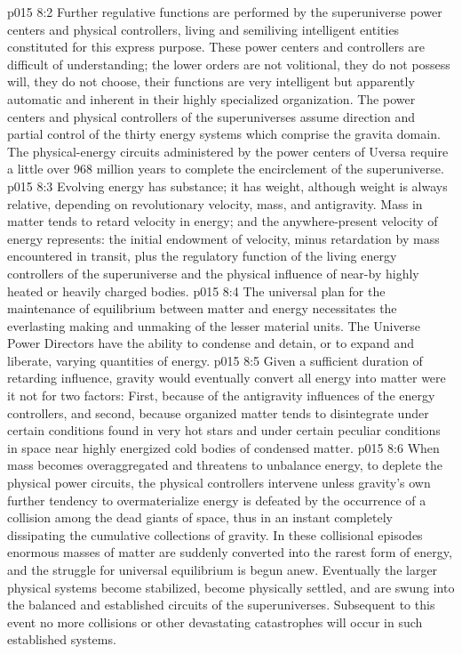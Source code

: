 \vs p015 8:2 Further regulative functions are performed by the superuniverse power centers and physical controllers, living and semiliving intelligent entities constituted for this express purpose. These power centers and controllers are difficult of understanding; the lower orders are not volitional, they do not possess will, they do not choose, their functions are very intelligent but apparently automatic and inherent in their highly specialized organization. The power centers and physical controllers of the superuniverses assume direction and partial control of the thirty energy systems which comprise the gravita domain. The physical\hyp{}energy circuits administered by the power centers of Uversa require a little over 968 million years to complete the encirclement of the superuniverse.
\vs p015 8:3 \pc Evolving energy has substance; it has weight, although weight is always relative, depending on revolutionary velocity, mass, and antigravity. Mass in matter tends to retard velocity in energy; and the anywhere\hyp{}present velocity of energy represents: the initial endowment of velocity, minus retardation by mass encountered in transit, plus the regulatory function of the living energy controllers of the superuniverse and the physical influence of near\hyp{}by highly heated or heavily charged bodies.
\vs p015 8:4 The universal plan for the maintenance of equilibrium between matter and energy necessitates the everlasting making and unmaking of the lesser material units. The Universe Power Directors have the ability to condense and detain, or to expand and liberate, varying quantities of energy.
\vs p015 8:5 Given a sufficient duration of retarding influence, gravity would eventually convert all energy into matter were it not for two factors: First, because of the antigravity influences of the energy controllers, and second, because organized matter tends to disintegrate under certain conditions found in very hot stars and under certain peculiar conditions in space near highly energized cold bodies of condensed matter.
\vs p015 8:6 When mass becomes overaggregated and threatens to unbalance energy, to deplete the physical power circuits, the physical controllers intervene unless gravity’s own further tendency to overmaterialize energy is defeated by the occurrence of a collision among the dead giants of space, thus in an instant completely dissipating the cumulative collections of gravity. In these collisional episodes enormous masses of matter are suddenly converted into the rarest form of energy, and the struggle for universal equilibrium is begun anew. Eventually the larger physical systems become stabilized, become physically settled, and are swung into the balanced and established circuits of the superuniverses. Subsequent to this event no more collisions or other devastating catastrophes will occur in such established systems.

